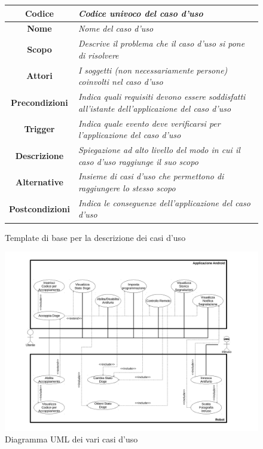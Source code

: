 \documentclass{article}
\begin{document}
    \begin{figure}[htbp]
    \centering
    \begin{tabular}{|c|l|}
    \hline
    \textbf{Codice} & \textit{Codice univoco del caso d'uso} \\ \hline
    \textbf{Nome} & \textit{Nome del caso d'uso} \\ \hline
    \textbf{Scopo} & \textit{Descrive il problema che il caso d'uso si pone di risolvere} \\ \hline
    \textbf{Attori} & \textit{I soggetti (non necessariamente persone) coinvolti nel caso d'uso} \\ \hline
    \textbf{Precondizioni} & \textit{Indica quali requisiti devono essere soddisfatti all'istante dell'applicazione del caso d'uso} \\ \hline
    \textbf{Trigger} & \textit{Indica quale evento deve verificarsi per l'applicazione del caso d'uso} \\ \hline
    \textbf{Descrizione} & \textit{Spiegazione ad alto livello del modo in cui il caso d'uso raggiunge il suo scopo} \\ \hline
    \textbf{Alternative} & \textit{Insieme di casi d'uso che permettono di raggiungere lo stesso scopo} \\ \hline
    \textbf{Postcondizioni} & \textit{Indica le conseguenze dell'applicazione del caso d'uso} \\ \hline
    \end{tabular}
    \caption{Template di base per la descrizione dei casi d’uso}
    \end{figure}
    
    \begin{figure}[htbp]
    \begin{adjustbox}{center}
    \includegraphics[width=20cm]{UC-Diagram.pdf}
    \end{adjustbox}
    \caption{Diagramma UML dei vari casi d'uso}
    \end{figure}
    
\end{document}
